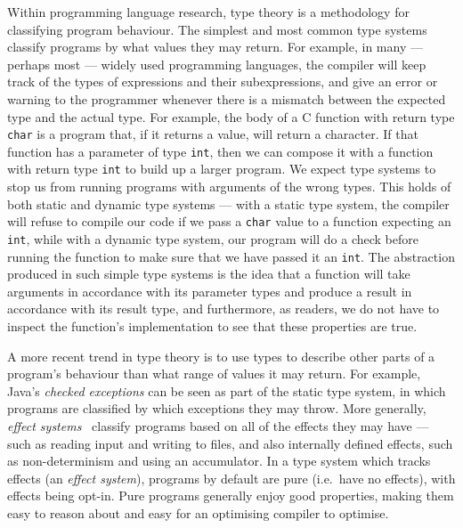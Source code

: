 Within programming language research, type theory is a methodology for
classifying program behaviour.
The simplest and most common type systems classify programs by what values they
may return.
For example, in many --- perhaps most --- widely used programming languages, the
compiler will keep track of the types of expressions and their subexpressions,
and give an error or warning to the programmer whenever there is a mismatch
between the expected type and the actual type.
For example, the body of a C function with return type \texttt{char} is a
program that, if it returns a value, will return a character.
If that function has a parameter of type \texttt{int}, then we can compose it
with a function with return type \texttt{int} to build up a larger program.
We expect type systems to stop us from running programs with arguments of the
wrong types.
This holds of both static and dynamic type systems --- with a static type
system, the compiler will refuse to compile our code if we pass a \texttt{char}
value to a function expecting an \texttt{int}, while with a dynamic type system,
our program will do a check before running the function to make sure that we
have passed it an \texttt{int}.
The abstraction produced in such simple type systems is the idea that a function
will take arguments in accordance with its parameter types and produce a result
in accordance with its result type, and furthermore, as readers, we do not have
to inspect the function's implementation to see that these properties are true.

A more recent trend in type theory is to use types to describe other parts of a
program's behaviour than what range of values it may return.
For example, Java's \emph{checked exceptions} can be seen as part of the static
type system, in which programs are classified by which exceptions they may
throw.
More generally, \emph{effect systems}~\citep{LG88} classify programs based on
all of the effects they may have ---
such as reading input and writing to files, and also
internally defined effects, such as non-determinism and using an accumulator.
In a type system which tracks effects (an \emph{effect system}), programs by
default are pure (i.e.\ have no effects), with effects being opt-in.
Pure programs generally enjoy good properties, making them easy to reason about
and easy for an optimising compiler to optimise.

